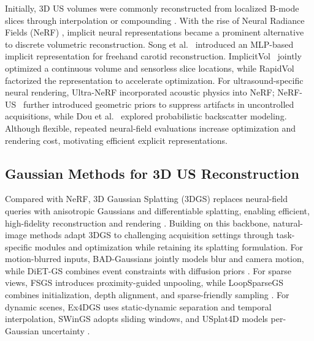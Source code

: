 Initially, 3D US volumes were commonly reconstructed from localized B-mode
slices through interpolation or compounding
\cite{mozaffariFreehand3DUltrasound2017}.
With the rise of Neural Radiance Fields (NeRF)
\cite{mildenhallNeRFRepresentingScenes2020}, implicit neural representations
became a prominent alternative to discrete volumetric reconstruction.
Song et al.~\cite{song2022a} introduced an MLP-based implicit representation
for freehand carotid reconstruction.
ImplicitVol~\cite{yeungSensorlessVolumetricReconstruction2024} jointly
optimized a continuous volume and sensorless slice locations, while
RapidVol~\cite{eidRapidvolRapidReconstruction2025} factorized the representation
to accelerate optimization.
For ultrasound-specific neural rendering, Ultra-NeRF
\cite{wysockiUltraNeRFNeuralRadiance2024} incorporated acoustic physics into
NeRF; NeRF-US~\cite{dagliNeRFUSRemovingUltrasound2024} further introduced
geometric priors to suppress artifacts in uncontrolled acquisitions, while
Dou et al.~\cite{douContinuousBernoulliDistribution2024} explored probabilistic
backscatter modeling.
Although flexible, repeated neural-field evaluations increase optimization and
rendering cost, motivating efficient explicit representations.

\vspace{-3mm}
\subsection{Gaussian Methods for 3D US Reconstruction}
\label{sec:related-work:gaussian-methods-for-3d-us-reconstruction}

Compared with NeRF, 3D Gaussian Splatting (3DGS) replaces neural-field queries
with anisotropic Gaussians and differentiable splatting, enabling
efficient, high-fidelity reconstruction and rendering
\cite{kerbl3DGaussianSplatting2023}.
Building on this backbone, natural-image methods adapt 3DGS to challenging
acquisition settings through task-specific modules and optimization while
retaining its splatting formulation.
For motion-blurred inputs, BAD-Gaussians jointly models blur and camera motion,
while DiET-GS combines event constraints with diffusion priors
\cite{zhaoBADGaussiansBundle2024,leeDiETGSDiffusionPrior2025}.
For sparse views, FSGS introduces proximity-guided unpooling, while LoopSparseGS
combines initialization, depth alignment, and sparse-friendly sampling
\cite{zhuFSGSRealTimeFewShot2025,baoLoopSparseGSLoopBased2025}.
For dynamic scenes, Ex4DGS uses static-dynamic separation and temporal
interpolation, SWinGS adopts sliding windows, and USplat4D models per-Gaussian
uncertainty
\cite{leeFullyExplicitDynamic2024,shawSWinGSSlidingWindows2024,
guoUncertaintyMattersDynamic2026}.

